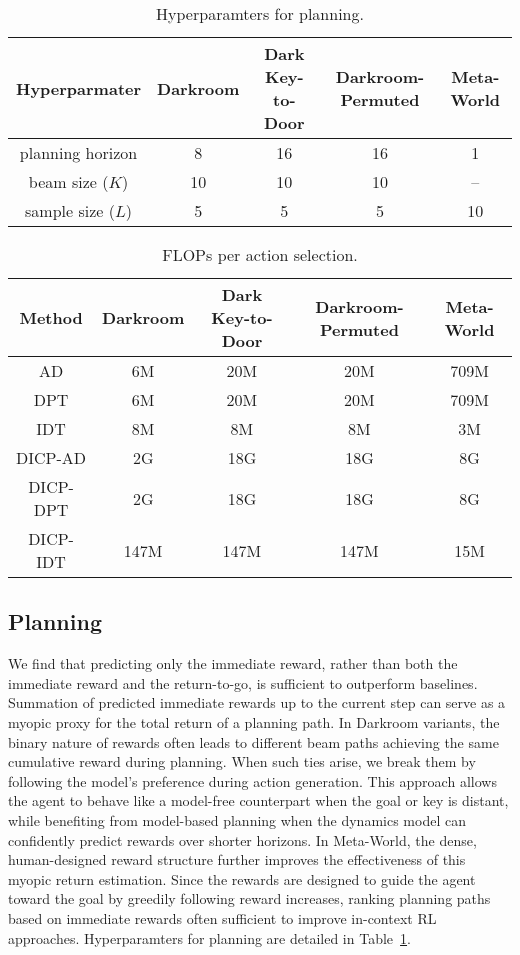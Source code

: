 \documentclass{article}
\begin{document}
\begin{table}[t]
    \caption{Hyperparamters for planning.
    }
    \label{tab:hyp-plan}
    \small \centering
    \begin{tabular}{ccccc}
    \toprule
    Hyperparmater & Darkroom & Dark Key-to-Door & Darkroom-Permuted & Meta-World\\
    \midrule
    planning horizon & 8 & 16 & 16 & 1\\
    beam size ($K$) & 10 & 10 & 10 & --\\
    sample size ($L$) & 5 & 5 & 5 & 10\\
    \bottomrule
    \end{tabular}
\end{table}

\begin{table}[b]
    \caption{FLOPs per action selection.}
    \label{tab:flops}
    \small \centering
    \begin{tabular}{ccccc}
    \toprule
    Method & Darkroom & Dark Key-to-Door & Darkroom-Permuted & Meta-World\\
    \midrule
    AD & 6M & 20M & 20M & 709M \\
    DPT & 6M & 20M & 20M & 709M \\
    IDT & 8M & 8M & 8M & 3M \\
    \midrule
    DICP-AD & 2G & 18G & 18G & 8G \\
    DICP-DPT & 2G & 18G & 18G & 8G \\
    DICP-IDT & 147M & 147M & 147M & 15M \\
    \bottomrule
    \end{tabular}
\end{table}

\subsection{Planning}

We find that predicting only the immediate reward, rather than both the immediate reward and the return-to-go, is sufficient to outperform baselines.
Summation of predicted immediate rewards up to the current step can serve as a myopic proxy for the total return of a planning path.
In Darkroom variants, the binary nature of rewards often leads to different beam paths achieving the same cumulative reward during planning.
When such ties arise, we break them by following the model's preference during action generation.
This approach allows the agent to behave like a model-free counterpart when the goal or key is distant, while benefiting from model-based planning when the dynamics model can confidently predict rewards over shorter horizons.
In Meta-World, the dense, human-designed reward structure further improves the effectiveness of this myopic return estimation.
Since the rewards are designed to guide the agent toward the goal by greedily following reward increases, ranking planning paths based on immediate rewards often sufficient to improve in-context RL approaches.
Hyperparamters for planning are detailed in Table~\ref{tab:hyp-plan}.
\end{document}
